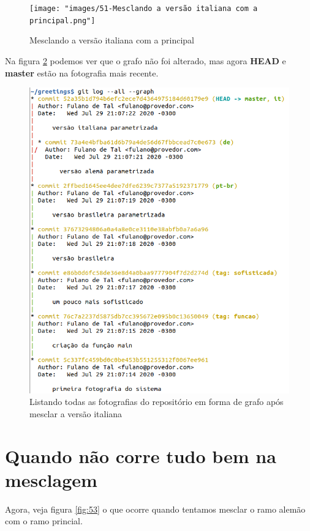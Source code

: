 \documentclass[a4paper]{book}
\begin{document}
\begin{figure}[ht]
\caption{Mesclando a versão italiana com a principal}
\label{fig:51}
\centering
\texttt{[image: "images/51-Mesclando a versão italiana com a principal.png"]}
\end{figure}

Na figura \ref{fig:52} podemos ver que o grafo não foi 
alterado, mas agora \textbf{HEAD} e \textbf{master}
estão na fotografia mais recente.

\begin{figure}[h!]
\caption{Listando todas as fotografias do repositório em forma de grafo após mesclar a versão italiana}
\label{fig:52}
\centering
\includegraphics[scale=0.6]{"images/52-Listando todas as fotografias do repositório em forma de grafo após mesclar a versão italiana.png"}
\end{figure}

\newpage
\section{Quando não corre tudo bem na mesclagem}

Agora, veja figura \ref{fig:53} o que ocorre quando tentamos 
mesclar o ramo alemão com o ramo princial.
\end{document}
